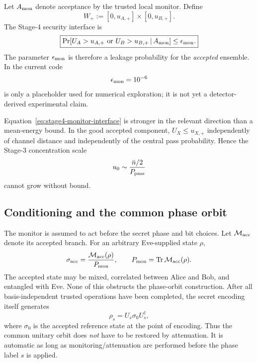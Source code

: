 \documentclass[11pt]{article}
\theoremstyle{remark}
\begin{document}
Let \(A_{\rm mon}\) denote acceptance by the trusted local monitor.  Define
\begin{equation}
    W_+
    :=
    [0,u_{A,+}]
    \times
    [0,u_{B,+}].
    \label{eq:stage4-good-region}
\end{equation}
The Stage-4 security interface is
\begin{equation}
    \boxed{
    \Pr\!\left[
      U_A>u_{A,+}
      \ \text{or}\
      U_B>u_{B,+}
      \,\middle|\,
      A_{\rm mon}
    \right]
    \le
    \epsilon_{\rm mon}.
    }
    \label{eq:stage4-monitor-interface}
\end{equation}
The parameter \(\epsilon_{\rm mon}\) is therefore a leakage probability for
the \emph{accepted} ensemble.  In the current code
\begin{equation}
    \epsilon_{\rm mon}=10^{-6}
    \label{eq:stage4-current-eps}
\end{equation}
is only a placeholder used for numerical exploration; it is not yet a
detector-derived experimental claim.

Equation~\eqref{eq:stage4-monitor-interface} is stronger in the relevant
direction than a mean-energy bound.  In the good accepted component,
\(U_X\le u_{X,+}\) independently of channel distance and independently of the
central pass probability.  Hence the Stage-3 concentration scale
\[
    u_0\sim\frac{\bar n/2}{P_{\rm pass}}
\]
cannot grow without bound.

\subsection{Conditioning and the common phase orbit}

The monitor is assumed to act before the secret phase and bit choices.  Let
\(\mathcal M_{\rm acc}\) denote its accepted branch.  For an arbitrary
Eve-supplied state \(\rho\),
\begin{equation}
    \sigma_{\rm acc}
    =
    \frac{\mathcal M_{\rm acc}(\rho)}
         {P_{\rm mon}},
    \qquad
    P_{\rm mon}
    =
    \operatorname{Tr}\mathcal M_{\rm acc}(\rho).
    \label{eq:stage4-conditioned-state}
\end{equation}
The accepted state may be mixed, correlated between Alice and Bob, and
entangled with Eve.  None of this obstructs the phase-orbit construction.
After all basis-independent trusted operations have been completed, the
secret encoding itself generates
\begin{equation}
    \rho_s
    =
    U_s\sigma_0U_s^\dagger,
    \label{eq:stage4-common-orbit}
\end{equation}
where \(\sigma_0\) is the accepted reference state at the point of encoding.
Thus the common unitary orbit does \emph{not} have to be restored by
attenuation.  It is automatic as long as monitoring/attenuation are performed
before the phase label \(s\) is applied.
\end{document}
